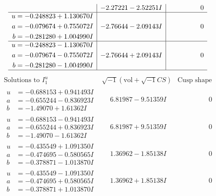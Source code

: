 \documentclass[1p]{elsarticle_modified}
\theoremstyle{definition}
\newcommand{\I}{\sqrt{-1}}
\begin{document}
$$\begin{array}{c|c|c}
 & -2.27221 - 2.52251 I & \phantom{-0.000000 } 0 \\ \hline\begin{aligned}
u &= -0.248823 + 1.130670 I \\
a &= -0.079674 + 0.755072 I \\
b &= -0.281280 + 1.004990 I\end{aligned}
 & -2.76644 - 2.09143 I & \phantom{-0.000000 } 0 \\ \hline\begin{aligned}
u &= -0.248823 - 1.130670 I \\
a &= -0.079674 - 0.755072 I \\
b &= -0.281280 - 1.004990 I\end{aligned}
 & -2.76644 + 2.09143 I & \phantom{-0.000000 } 0\\
 \hline 
 \end{array}$$\newpage$$\begin{array}{c|c|c}  
\text{Solutions to }I^u_{1}& \I (\text{vol} + \sqrt{-1}CS) & \text{Cusp shape}\\
 \hline 
\begin{aligned}
u &= -0.688153 + 0.941493 I \\
a &= -0.655244 - 0.836923 I \\
b &= -1.49070 + 1.61362 I\end{aligned}
 & \phantom{-}6.81987 - 9.51359 I & \phantom{-0.000000 } 0 \\ \hline\begin{aligned}
u &= -0.688153 - 0.941493 I \\
a &= -0.655244 + 0.836923 I \\
b &= -1.49070 - 1.61362 I\end{aligned}
 & \phantom{-}6.81987 + 9.51359 I & \phantom{-0.000000 } 0 \\ \hline\begin{aligned}
u &= -0.435549 + 1.091350 I \\
a &= -0.474695 - 0.580565 I \\
b &= -0.378871 - 1.013870 I\end{aligned}
 & \phantom{-}1.36962 - 1.85138 I & \phantom{-0.000000 } 0 \\ \hline\begin{aligned}
u &= -0.435549 - 1.091350 I \\
a &= -0.474695 + 0.580565 I \\
b &= -0.378871 + 1.013870 I\end{aligned}
 & \phantom{-}1.36962 + 1.85138 I & \phantom{-0.000000 } 0 \\ \hline\begin{aligned}

\end{aligned}
\end{array}$$
\end{document}
